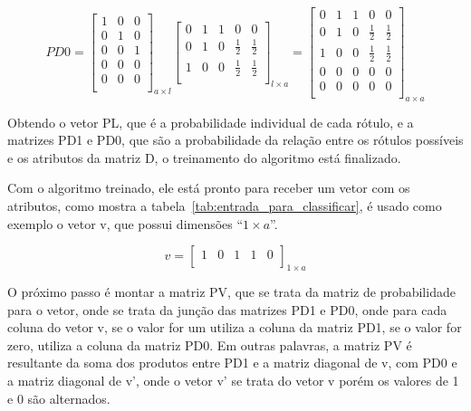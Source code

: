 $$PD0=\left[
\begin{array}{ccc}
1 & 0 & 0 \\
0 & 1 & 0 \\
0 & 0 & 1 \\
0 & 0 & 0 \\
0 & 0 & 0 \\
\end{array}
\right]_{a \times l}
\left[
\begin{array}{ccccc}
0 & 1 & 1 & 0 & 0 \\
0 & 1 & 0 & \frac{1}{2} & \frac{1}{2} \\
1 & 0 & 0 & \frac{1}{2} & \frac{1}{2} \\
\end{array}
\right]_{l \times a}
= \left[
\begin{array}{ccccc}
0 & 1 & 1 & 0 & 0 \\
0 & 1 & 0 & \frac{1}{2} & \frac{1}{2} \\
1 & 0 & 0 & \frac{1}{2} & \frac{1}{2} \\
0 & 0 & 0 & 0 & 0 \\
0 & 0 & 0 & 0 & 0 \\
\end{array}
\right]_{a \times a}$$

Obtendo o vetor PL, que é a probabilidade individual de cada rótulo, e a
matrizes PD1 e PD0, que são a probabilidade da relação entre os rótulos
possíveis e os atributos da matriz D, o treinamento do algoritmo está
finalizado.

Com o algoritmo treinado, ele está pronto para receber um vetor com
os atributos, como mostra a tabela~\ref{tab:entrada_para_classificar},
é usado como exemplo o vetor v, que possui dimensões ``${1 \times a}$''.

$$v=\left[
\begin{array}{ccccc}
1 & 0 & 1 & 1 & 0 \\
\end{array}
\right]_{1 \times a}$$

O próximo passo é montar a matriz PV, que se trata da matriz de
probabilidade para o vetor, onde se trata da junção das matrizes
PD1 e PD0, onde para cada coluna do vetor v, se o valor for um
utiliza a coluna da matriz PD1, se o valor for zero, utiliza a
coluna da matriz PD0. Em outras palavras, a matriz PV é resultante
da soma dos produtos entre PD1 e a matriz diagonal de v, com PD0
e a matriz diagonal de v', onde o vetor v' se trata do vetor v
porém os valores de 1 e 0 são alternados.

